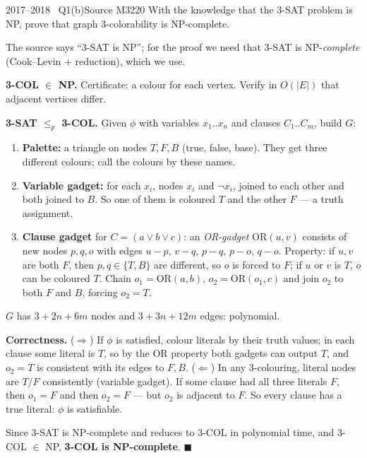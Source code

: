 \documentclass[11pt,a4paper]{article}
\begin{document}
\begin{question}{2017--2018 \textbullet\ Q1(b)}{Source M32}{20}
With the knowledge that the 3-SAT problem is NP, prove that graph 3-colorability is NP-complete.
\end{question}
\begin{solution}
\begin{note}The source says ``3-SAT is NP''; for the proof we need that 3-SAT is NP-\emph{complete} (Cook--Levin + reduction), which we use.\end{note}
\textbf{3-COL $\in$ NP.} Certificate: a colour for each vertex. Verify in $O(|E|)$ that adjacent vertices differ.

\textbf{3-SAT $\le_p$ 3-COL.} Given $\phi$ with variables $x_1..x_n$ and clauses $C_1..C_m$, build $G$:
\begin{enumerate}
\item \textbf{Palette:} a triangle on nodes $T,F,B$ (true, false, base). They get three different colours; call the colours by these names.
\item \textbf{Variable gadget:} for each $x_i$, nodes $x_i$ and $\neg x_i$, joined to each other and both joined to $B$. So one of them is coloured $T$ and the other $F$ --- a truth assignment.
\item \textbf{Clause gadget} for $C=(a\vee b\vee c)$: an \emph{OR-gadget} $\mathrm{OR}(u,v)$ consists of new nodes $p,q,o$ with edges $u\!-\!p$, $v\!-\!q$, $p\!-\!q$, $p\!-\!o$, $q\!-\!o$. Property: if $u,v$ are both $F$, then $p,q\in\{T,B\}$ are different, so $o$ is forced to $F$; if $u$ or $v$ is $T$, $o$ can be coloured $T$. Chain $o_1=\mathrm{OR}(a,b)$, $o_2=\mathrm{OR}(o_1,c)$ and join $o_2$ to both $F$ and $B$, forcing $o_2=T$.
\end{enumerate}
$G$ has $3+2n+6m$ nodes and $3+3n+12m$ edges: polynomial.

\textbf{Correctness.} ($\Rightarrow$) If $\phi$ is satisfied, colour literals by their truth values; in each clause some literal is $T$, so by the OR property both gadgets can output $T$, and $o_2=T$ is consistent with its edges to $F,B$. ($\Leftarrow$) In any 3-colouring, literal nodes are $T$/$F$ consistently (variable gadget). If some clause had all three literals $F$, then $o_1=F$ and then $o_2=F$ --- but $o_2$ is adjacent to $F$. So every clause has a true literal: $\phi$ is satisfiable.

Since 3-SAT is NP-complete and reduces to 3-COL in polynomial time, and 3-COL $\in$ NP, \textbf{3-COL is NP-complete}. \hfill$\blacksquare$
\end{solution}
\end{document}
